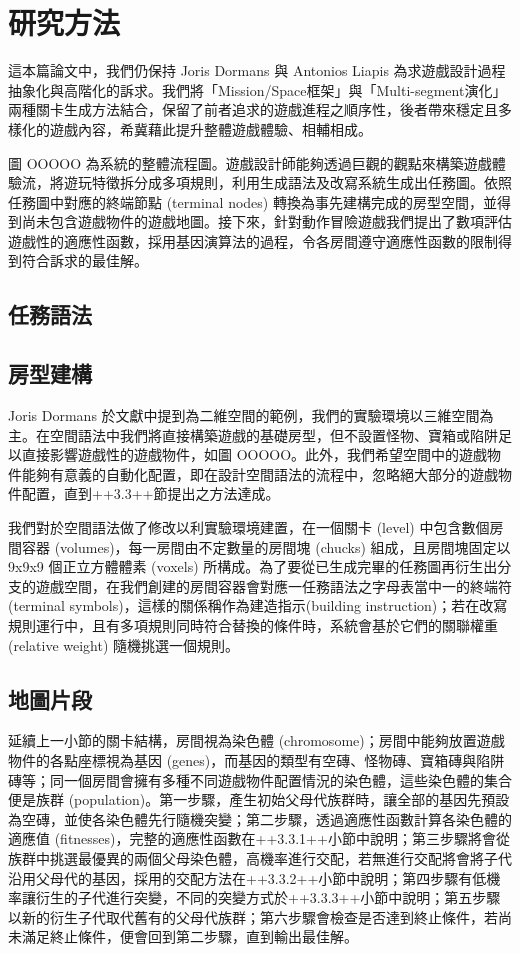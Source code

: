 \chapter{研究方法}
\label{cha:methodology}

這本篇論文中，我們仍保持 Joris Dormans 與 Antonios Liapis 為求遊戲設計過程抽象化與高階化的訴求。我們將「Mission/Space框架」與「Multi-segment演化」兩種關卡生成方法結合，保留了前者追求的遊戲進程之順序性，後者帶來穩定且多樣化的遊戲內容，希冀藉此提升整體遊戲體驗、相輔相成。

圖 OOOOO 為系統的整體流程圖。遊戲設計師能夠透過巨觀的觀點來構築遊戲體驗流，將遊玩特徵拆分成多項規則，利用生成語法及改寫系統生成出任務圖。依照任務圖中對應的終端節點 (terminal nodes) 轉換為事先建構完成的房型空間，並得到尚未包含遊戲物件的遊戲地圖。接下來，針對動作冒險遊戲我們提出了數項評估遊戲性的適應性函數，採用基因演算法的過程，令各房間遵守適應性函數的限制得到符合訴求的最佳解。

\section{任務語法}



\section{房型建構}

Joris Dormans 於文獻中提到為二維空間的範例，我們的實驗環境以三維空間為主。在空間語法中我們將直接構築遊戲的基礎房型，但不設置怪物、寶箱或陷阱足以直接影響遊戲性的遊戲物件，如圖 OOOOO。此外，我們希望空間中的遊戲物件能夠有意義的自動化配置，即在設計空間語法的流程中，忽略絕大部分的遊戲物件配置，直到++3.3++節提出之方法達成。

我們對於空間語法做了修改以利實驗環境建置，在一個關卡 (level) 中包含數個房間容器 (volumes)，每一房間由不定數量的房間塊 (chucks) 組成，且房間塊固定以 9x9x9 個正立方體體素 (voxels) 所構成。為了要從已生成完畢的任務圖再衍生出分支的遊戲空間，在我們創建的房間容器會對應一任務語法之字母表當中一的終端符 (terminal symbols)，這樣的關係稱作為建造指示(building instruction)；若在改寫規則運行中，且有多項規則同時符合替換的條件時，系統會基於它們的關聯權重 (relative weight) 隨機挑選一個規則。


\section{地圖片段}

延續上一小節的關卡結構，房間視為染色體 (chromosome)；房間中能夠放置遊戲物件的各點座標視為基因 (genes)，而基因的類型有空磚、怪物磚、寶箱磚與陷阱磚等；同一個房間會擁有多種不同遊戲物件配置情況的染色體，這些染色體的集合便是族群 (population)。第一步驟，產生初始父母代族群時，讓全部的基因先預設為空磚，並使各染色體先行隨機突變；第二步驟，透過適應性函數計算各染色體的適應值 (fitnesses)，完整的適應性函數在++3.3.1++小節中說明；第三步驟將會從族群中挑選最優異的兩個父母染色體，高機率進行交配，若無進行交配將會將子代沿用父母代的基因，採用的交配方法在++3.3.2++小節中說明；第四步驟有低機率讓衍生的子代進行突變，不同的突變方式於++3.3.3++小節中說明；第五步驟以新的衍生子代取代舊有的父母代族群；第六步驟會檢查是否達到終止條件，若尚未滿足終止條件，便會回到第二步驟，直到輸出最佳解。

